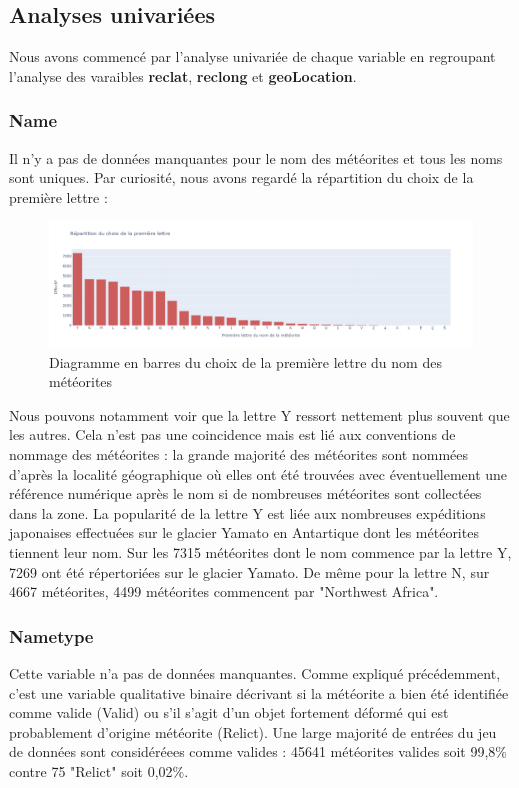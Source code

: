 \documentclass[12pt]{article}
\begin{document}
\subsection{Analyses univariées}
Nous avons commencé par l'analyse univariée de chaque variable en regroupant l'analyse des varaibles \textbf{reclat}, \textbf{reclong} et \textbf{geoLocation}. 
\\
\subsubsection*{Name}
Il n'y a pas de données manquantes pour le nom des météorites et tous les noms sont uniques. Par curiosité, nous avons regardé la répartition du choix de la première lettre :
\begin{figure}[H]
\centering
\includegraphics[width=15cm]{Images/exploration/name_barplot_lettres.png}
\caption{Diagramme en barres du choix de la première lettre du nom des météorites}
\end{figure}
Nous pouvons notamment voir que la lettre Y ressort nettement plus souvent que les autres. Cela n'est pas une coincidence mais est lié aux conventions de nommage des météorites \cite{Convention_nommage_meteorites} : la grande majorité des météorites sont nommées d'après la localité géographique où elles ont été trouvées avec éventuellement une référence numérique après le nom si de nombreuses météorites sont collectées dans la zone. La popularité de la lettre Y est liée aux nombreuses expéditions japonaises effectuées sur le glacier Yamato en Antartique dont les météorites tiennent leur nom. Sur les 7315 météorites dont le nom commence par la lettre Y, 7269 ont été répertoriées sur le glacier Yamato. De même pour la lettre N, sur 4667 météorites, 4499 météorites commencent par "Northwest Africa".
\subsubsection*{Nametype}
Cette variable n'a pas de données manquantes. Comme expliqué précédemment, c'est une variable qualitative binaire décrivant si la météorite a bien été identifiée comme valide (Valid) ou s'il s'agit d'un objet fortement déformé qui est probablement d'origine météorite (Relict). Une large majorité de entrées du jeu de données sont considéréees comme valides : 45641 météorites valides soit 99,8\% contre 75 "Relict" soit 0,02\%.
\end{document}
